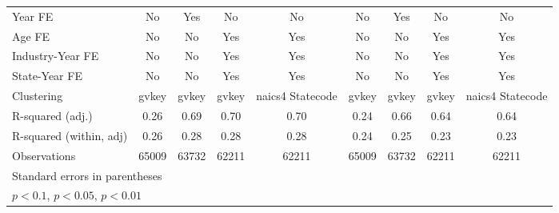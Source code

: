 {\begin{tabular}{l*{8}{c}}
\addlinespace
Year FE             &          No         &         Yes         &          No         &          No         &          No         &         Yes         &          No         &          No         \\
\addlinespace
Age FE              &          No         &          No         &         Yes         &         Yes         &          No         &          No         &         Yes         &         Yes         \\
\addlinespace
Industry-Year FE    &          No         &          No         &         Yes         &         Yes         &          No         &          No         &         Yes         &         Yes         \\
\addlinespace
State-Year FE       &          No         &          No         &         Yes         &         Yes         &          No         &          No         &         Yes         &         Yes         \\
\midrule
Clustering          &       gvkey         &       gvkey         &       gvkey         &naics4 Statecode         &       gvkey         &       gvkey         &       gvkey         &naics4 Statecode         \\
R-squared (adj.)    &        0.26         &        0.69         &        0.70         &        0.70         &        0.24         &        0.66         &        0.64         &        0.64         \\
R-squared (within, adj)&        0.26         &        0.28         &        0.28         &        0.28         &        0.24         &        0.25         &        0.23         &        0.23         \\
Observations        &       65009         &       63732         &       62211         &       62211         &       65009         &       63732         &       62211         &       62211         \\
\bottomrule
\multicolumn{9}{l}{\footnotesize Standard errors in parentheses}\\
\multicolumn{9}{l}{\footnotesize \sym{*} \(p<0.1\), \sym{**} \(p<0.05\), \sym{***} \(p<0.01\)}\\
\end{tabular}
}
